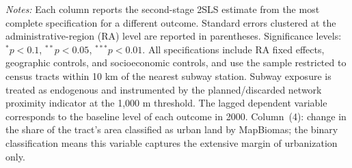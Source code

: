 \begin{table}[htbp]
\centering
\caption{Urban structure and demographic outcomes: 2SLS estimates using the full specification (10 km sample, 1,000 m threshold)}
\label{tab:sorting_tests}
\begin{tablenotes}
\scriptsize
\item \textit{Notes:} Each column reports the second-stage 2SLS estimate from the most complete specification for a different outcome. Standard errors clustered at the administrative-region (RA) level are reported in parentheses. Significance levels: $^{*}p<0.1$, $^{**}p<0.05$, $^{***}p<0.01$. All specifications include RA fixed effects, geographic controls, and socioeconomic controls, and use the sample restricted to census tracts within 10 km of the nearest subway station. Subway exposure is treated as endogenous and instrumented by the planned/discarded network proximity indicator at the 1,000 m threshold. The lagged dependent variable corresponds to the baseline level of each outcome in 2000. Column~(4): change in the share of the tract's area classified as urban land by MapBiomas; the binary classification means this variable captures the extensive margin of urbanization only.
\end{tablenotes}
\end{table}

